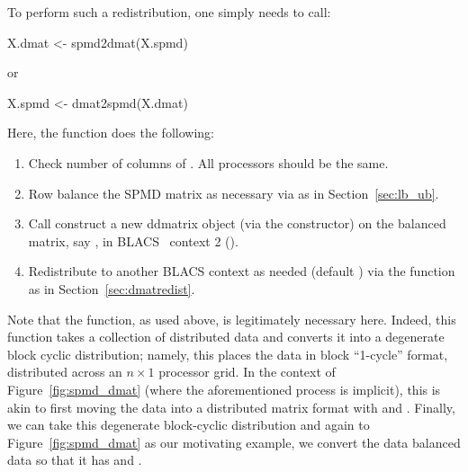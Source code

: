 To perform such a redistribution, one simply needs to call:~
\begin{Code}[title=R Code]
X.dmat <- spmd2dmat(X.spmd)
\end{Code}
or
\begin{Code}[title=R Code]
X.spmd <- dmat2spmd(X.dmat)
\end{Code}
Here, the  function does the following:
\begin{enumerate}
\item Check number of columns of .  All
      processors should be the same.
\item Row balance the SPMD matrix as necessary via  as in Section~\ref{sec:lb_ub}.
\item Call construct a new ddmatrix object (via the  constructor) on the balanced matrix,
      say , in BLACS~ context 2 ().
\item Redistribute  to another BLACS context as needed 
      (default ) via the  function as in Section~\ref{sec:dmatredist}.
\end{enumerate}
Note that the  function, as used above, is legitimately necessary here.  Indeed, this function takes a collection of distributed data and converts it into a degenerate block cyclic distribution; namely, this places the data in block ``1-cycle'' format, distributed across an $n\times 1$ processor grid.  In the context of Figure~\ref{fig:spmd_dmat} (where the aforementioned process is implicit), this is akin to first moving the data into a distributed matrix format with  and .  Finally, we can take this degenerate block-cyclic distribution and again to Figure~\ref{fig:spmd_dmat} as our motivating example, we convert the data balanced data so that it has  and .

